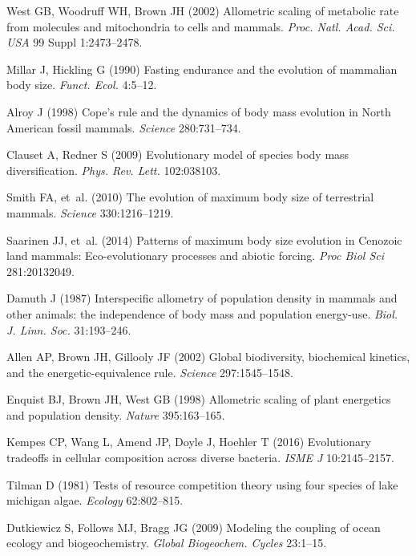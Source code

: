 \documentclass{pnastwo}
\begin{document}
\begin{article}
{\begin{thebibliography}{10}
West GB, Woodruff WH, Brown JH
\newblock (2002) {Allometric scaling of metabolic rate from molecules and
  mitochondria to cells and mammals.}
\newblock \emph{Proc. Natl. Acad. Sci. USA} 99 Suppl 1:2473--2478.

Millar J, Hickling G
\newblock (1990) {Fasting endurance and the evolution of mammalian body size}.
\newblock \emph{Funct. Ecol.} 4:5--12.

Alroy J
\newblock (1998) {Cope's rule and the dynamics of body mass evolution in North
  American fossil mammals}.
\newblock \emph{Science} 280:731--734.

Clauset A, Redner S
\newblock (2009) {Evolutionary model of species body mass diversification}.
\newblock \emph{Phys. Rev. Lett.} 102:038103.

Smith FA, {et~al.}
\newblock (2010) {The evolution of maximum body size of terrestrial mammals}.
\newblock \emph{Science} 330:1216--1219.

Saarinen JJ, {et~al.}
\newblock (2014) {Patterns of maximum body size evolution in Cenozoic land
  mammals: Eco-evolutionary processes and abiotic forcing}.
\newblock \emph{Proc Biol Sci} 281:20132049.

Damuth J
\newblock (1987) {Interspecific allometry of population density in mammals and
  other animals: the independence of body mass and population energy-use}.
\newblock \emph{Biol. J. Linn. Soc.} 31:193--246.

Allen AP, Brown JH, Gillooly JF
\newblock (2002) {Global biodiversity, biochemical kinetics, and the
  energetic-equivalence rule}.
\newblock \emph{Science} 297:1545--1548.

Enquist BJ, Brown JH, West GB
\newblock (1998) {Allometric scaling of plant energetics and population
  density}.
\newblock \emph{Nature} 395:163--165.

Kempes CP, Wang L, Amend JP, Doyle J, Hoehler T
\newblock (2016) {Evolutionary tradeoffs in cellular composition across diverse
  bacteria}.
\newblock \emph{ISME J} 10:2145--2157.

Tilman D
\newblock (1981) {Tests of resource competition theory using four species of
  lake michigan algae}.
\newblock \emph{Ecology} 62:802--815.

Dutkiewicz S, Follows MJ, Bragg JG
\newblock (2009) {Modeling the coupling of ocean ecology and biogeochemistry}.
\newblock \emph{Global Biogeochem. Cycles} 23:1--15.


\end{thebibliography}}
\end{article}
\end{document}
